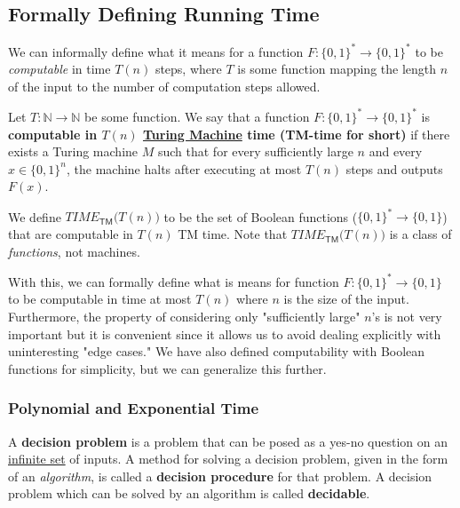 \subsection{Formally Defining Running Time}

  We can informally define what it means for a function $F: \{0,1\}^* \to \{0,1\}^*$ to be \textit{computable} in time $T(n)$ steps, where $T$ is some function mapping the length $n$ of the input to the number of computation steps allowed. 

  \begin{definition}
    \label{def:computable-in-turing-machine-time-tn}
  Let $T: \mathbb{N} \to \mathbb{N}$ be some function. We say that a function $F: \{0,1\}^* \to \{0,1\}^*$ is \textbf{computable in $T(n)$ \hyperref[def:turing-machine]{Turing Machine} time (TM-time for short)} if there exists a Turing machine $M$ such that for every sufficiently large $n$ and every $x \in \{0,1\}^n$, the machine halts after executing at most $T(n)$ steps and outputs $F(x)$. 

  We define $TIME_{\mathsf{TM}}\big(T(n)\big)$ to be the set of Boolean functions ($\{0,1\}^* \to \{0,1\}$) that are computable in $T(n)$ TM time. Note that $TIME_{\mathsf{TM}}\big(T(n)\big)$ is a class of \textit{functions}, not machines. 
  \end{definition}

  With this, we can formally define what is means for function $F: \{0,1\}^* \to \{0,1\}$ to be computable in time at most $T(n)$ where $n$ is the size of the input. Furthermore, the property of considering only "sufficiently large" $n$'s is not very important but it is convenient since it allows us to avoid dealing explicitly with uninteresting "edge cases." We have also defined computability with Boolean functions for simplicity, but we can generalize this further. 

\subsubsection{Polynomial and Exponential Time}

  \begin{definition}
    \label{def:decision-problem}
    A \textbf{decision problem} is a problem that can be posed as a yes-no question on an \hyperref[st-def:infinite-set]{infinite set} of inputs. A method for solving a decision problem, given in the form of an \textit{algorithm}, is called a \textbf{decision procedure} for that problem. A decision problem which can be solved by an algorithm is called \textbf{decidable}. 
  \end{definition}

